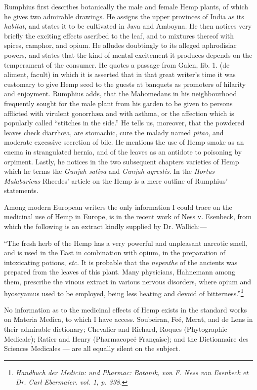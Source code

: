 \documentclass[a4paper, 11pt, oneside, polutonikogreek, english]{article}
\begin{document}
Rumphius first describes botanically the male and female Hemp plants, of which he gives two admirable drawings. He assigns the upper provinces of India as its \emph{habitat}, and states it to be cultivated in Java and Amboyna. He then notices very briefly the exciting effects ascribed to the leaf, and to mixtures thereof with spices, camphor, and opium. He alludes doubtingly to its alleged aphrodisiac powers, and states that the kind of mental excitement it produces depends on the temperament of the consumer. He quotes a passage from Galen, lib. 1. (de aliment, facult) in which it is asserted that in that great writer's time it was customary to give Hemp seed to the guests at banquets as promoters of hilarity and enjoyment. Rumphius adds, that the Mahomedans in his neighbourhood frequently sought for the male plant from his garden to be given to persons afflicted with virulent gonorrhæa and with asthma, or the affection which is popularly called ``stitches in the side.'' He tells us, moreover, that the powdered leaves check diarrhœa, are stomachic, cure the malady named \emph{pitao}, and moderate excessive secretion of bile. He mentions the use of Hemp smoke as an enema in strangulated hernia, and of the leaves as an antidote to poisoning by orpiment. Lastly, he notices in the two subsequent chapters varieties of Hemp which he terms the \emph{Gunjah sativa} and \emph{Gunjah agrestis}. In the \emph{Hortus Malabaricus} Rheedes' article on the Hemp is a mere outline of Rumphius' statements.

Among modern European writers the only information I could trace on the medicinal use of Hemp in Europe, is in the recent work of Ness v. Esenbeck, from which the following is an extract kindly supplied by Dr. Wallich:---

``The fresh herb of the Hemp has a very powerful and unpleasant narcotic smell, and is used in the East in combination with opium, in the preparation of intoxicating potions, \emph{etc.} It is probable that the \emph{nepenthe} of the ancients was prepared from the leaves of this plant. Many physicians, Hahnemann among them, prescribe the vinous extract in various nervous disorders, where opium and hyoscyamus used to be employed, being less heating and devoid of bitterness.''\footnote{\emph{Handbuch der Medicin: und Pharmac: Botanik, von F. Ness von Esenbeck et Dr. Carl Ebermaier. vol. 1, p. 338.}}

No information as to the medicinal effects of Hemp exists in the standard works on Materia Medica, to which I have access. Soubeiran, Feé, Merat, and de Lens in their admirable dictionary; Chevalier and Richard, Roques (Phytographie Medicale); Ratier and Henry (Pharmacopeé Française); and the Dictionnaire des Sciences Medicales --- are all equally silent on the subject.
\end{document}
